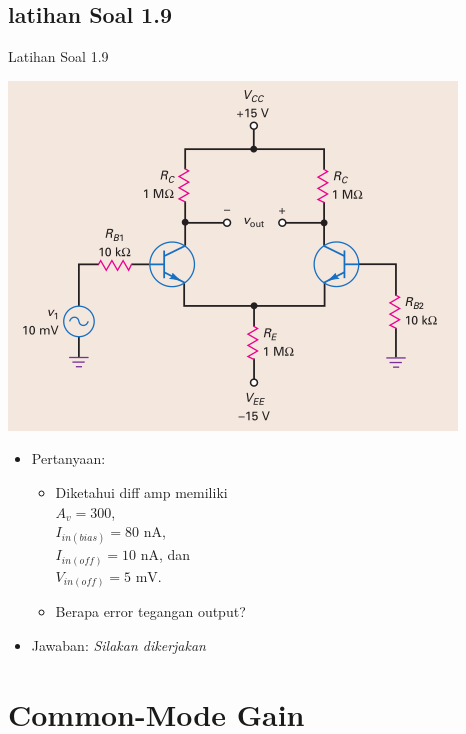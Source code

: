 \documentclass[aspectratio=169]{beamer}
\begin{document}
\subsection{latihan Soal 1.9}
\begin{frame}{Latihan Soal 1.9}
	\begin{multicols}{2}
		\begin{center}
			\includegraphics[height=0.7\textheight]{gambar/01.contoh_soal_9}
		\end{center}
		\columnbreak
		\begin{itemize}
			\item Pertanyaan:
			\begin{itemize}
				\item Diketahui diff amp memiliki\\
				$ A_v = 300 $, \\
				$ I_{in(bias)} = 80 \text{ nA}$, \\
				$ I_{in(off)} = 10 \text{ nA}$, dan \\
				$ V_{in(off)} = 5 \text{ mV}$.
				\item Berapa error tegangan output?
			\end{itemize}
			\item Jawaban: \textit{Silakan dikerjakan}
		\end{itemize}
	\end{multicols}
\end{frame}

\section{Common-Mode Gain}
\end{document}
